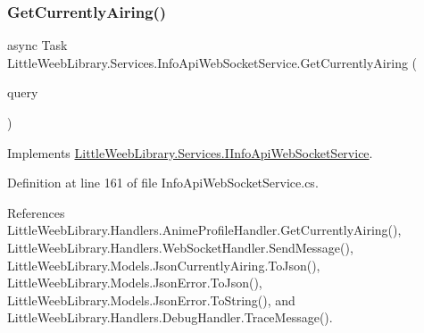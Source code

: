 \subsubsection{\texorpdfstring{Get\+Currently\+Airing()}{GetCurrentlyAiring()}\hspace{0.1cm}{\footnotesize\ttfamily [2/2]}}
{\footnotesize\ttfamily async Task Little\+Weeb\+Library.\+Services.\+Info\+Api\+Web\+Socket\+Service.\+Get\+Currently\+Airing (\begin{DoxyParamCaption}\item[{J\+Object}]{query }\end{DoxyParamCaption})}



Implements \mbox{\hyperlink{interface_little_weeb_library_1_1_services_1_1_i_info_api_web_socket_service_af0c98888bc126df1f8b3c1904c766dc9}{Little\+Weeb\+Library.\+Services.\+I\+Info\+Api\+Web\+Socket\+Service}}.



Definition at line 161 of file Info\+Api\+Web\+Socket\+Service.\+cs.



References Little\+Weeb\+Library.\+Handlers.\+Anime\+Profile\+Handler.\+Get\+Currently\+Airing(), Little\+Weeb\+Library.\+Handlers.\+Web\+Socket\+Handler.\+Send\+Message(), Little\+Weeb\+Library.\+Models.\+Json\+Currently\+Airing.\+To\+Json(), Little\+Weeb\+Library.\+Models.\+Json\+Error.\+To\+Json(), Little\+Weeb\+Library.\+Models.\+Json\+Error.\+To\+String(), and Little\+Weeb\+Library.\+Handlers.\+Debug\+Handler.\+Trace\+Message().


